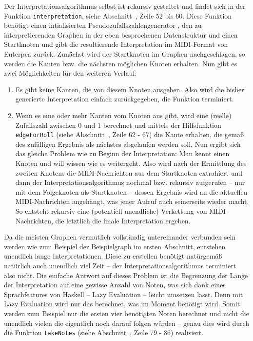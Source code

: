 \documentclass[a4paper,twocolumn]{article}
\begin{document}
Der Interpretationsalgorithmus selbst ist rekursiv \cite{wikipedia_rekursion} gestaltet und findet sich in
der Funktion \lstinline[basicstyle=\ttfamily]|interpretation|, siehe
Abschnitt~, Zeile 52 bis 60. Diese Funktion benötigt
einen intialisierten Pseudozufallszahlengenerator
\cite{random_random_gen,wikipedia_prng}, den
zu interpretierenden Graphen in der eben besprochenen Datenstruktur und einen
Startknoten und gibt die resultierende Interpretation im MIDI-Format von
Euterpea \cite{euterpea} zurück. Zunächst wird der Startknoten im Graphen
nachgeschlagen, so werden die Kanten bzw. die nächsten möglichen Knoten
erhalten. Nun gibt es zwei Möglichkeiten für den weiteren Verlauf:
\begin{enumerate}
  \item Es gibt keine Kanten, die von diesem Knoten ausgehen. Also wird die
    bisher generierte Interpretation einfach zurückgegeben, die Funktion
    terminiert.
  \item Wenn es eine oder mehr Kanten vom Knoten aus gibt, wird eine (reelle) Zufallszahl
    zwischen $0$ und $1$ berechnet und mittels der Hilfsfunktion \lstinline[basicstyle=\ttfamily]|edgeForRoll|
    (siehe Abschnitt~, Zeile 62 - 67) die
    Kante erhalten, die gemäß des zufälligen Ergebnis als nächstes abgelaufen werden
    soll. Nun ergibt sich das gleiche Problem wie zu Beginn der
    Interpretation: Man kennt einen Knoten und will wissen wie es weitergeht. Also
    wird nach der Ermittlung des zweiten Knotens die MIDI-Nachrichten aus dem
    Startknoten extrahiert und dann der Interpretationsalgorithmus nochmal bzw.
    rekursiv aufgerufen -- nur mit dem Folgeknoten als Startknoten -- dessen
    Ergebnis wird an die aktuellen MIDI-Nachrichten angehängt, was jener Aufruf auch
    seinerseits wieder macht. So entsteht rekursiv eine (potentiell unendliche)
    Verkettung von MIDI-Nachrichten, die letztlich die finale Interpretation ergeben.
\end{enumerate}

Da die meisten Graphen vermutlich vollständig untereinander verbunden sein
werden wie zum Beispiel der Beispielgraph im ersten Abschnitt, entstehen unendlich
lange Interpretationen. Diese zu erstellen benötigt natürgemäß natürlich auch
unendlich viel Zeit -- der Interpretationsalgorithmus terminiert also nicht.
Die einfache Antwort auf dieses Problem ist die Begrenzung der Länge der
Interpretation auf eine gewisse Anzahl von Noten, was sich dank eines
Sprachfeatures von Haskell -- Lazy Evaluation \cite{wikipedia_laziness} --
leicht umsetzen lässt. Denn mit Lazy Evaluation wird nur das berechnet, was im
Moment benötigt wird. Somit werden zum Beispiel nur die ersten vier benötigten
Noten berechnet und nicht die unendlich vielen die eigentlich noch darauf folgen
würden -- genau dies wird durch die Funktion
\lstinline[basicstyle=\ttfamily]|takeNotes| (siehe
Abschnitt~, Zeile 79 - 86) realisiert.
\end{document}
